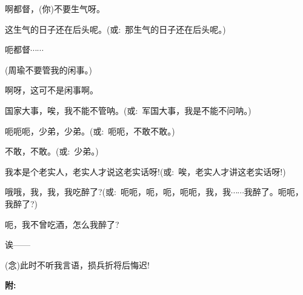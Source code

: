 {{啊都督，(你)不要生气呀。}

{这生气的日子还在后头呢。({\akai 或}:~那生气的日子还在后头呢。)}

{呃都督$\cdots{}\cdots{}$}

{(周瑜\hspace{30pt}不要管我的闲事。)}

{啊呀，这可不是闲事啊。}

{国家大事，唉，我不能不管呐。({\akai 或}:~军国大事，我是不能不问呐。)}

{呃呃呃，少弟，少弟。({\akai 或}:~呃呃，不敢不敢。)}

{不敢，不敢。({\akai 或}:~少弟。)}

{我本是个老实人，老实人才说这老实话呀!({\akai 或}:~唉，老实人才讲这老实话呀!)}

{哦哦，我，我，我吃醉了?({\akai 或}:~呃呃，呃，呃，呃呃，我，我$\cdots{}\cdots{}$我醉了。呃呃，我醉了?)}

{呃，我不曾吃酒，怎么我醉了?}

{诶------}

{({\akai 念})此时不听我言语，损兵折将后悔迟!}
}

\newpage
{\bfseries\hwfs 附:~}
\vspace{20pt}
